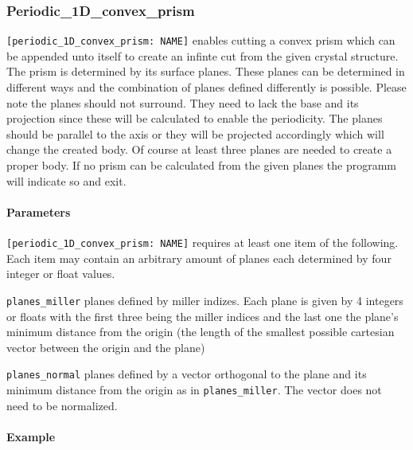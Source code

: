 \subsubsection{Periodic\_1D\_convex\_prism}
\lstinline{[periodic_1D_convex_prism: NAME]} enables cutting a convex prism which can be appended unto itself to create an infinte cut from the given crystal structure. The prism is determined by its surface planes. These planes can be determined in different ways and the combination of planes defined differently is possible. Please note the planes should not surround. They need to lack the base and its projection since these will be calculated to enable the periodicity. The planes should be parallel to the axis or they will be projected accordingly which will change the created body. Of course at least three planes are needed to create a proper body. If no prism can be calculated from the given planes the programm will indicate so and exit.

\paragraph{Parameters}
\lstinline{[periodic_1D_convex_prism: NAME]} requires at least one item of the following. Each item may contain an arbitrary amount of planes each determined by four integer or float values.

\begin{description}
 \item{\lstinline{planes_miller}} planes defined by miller indizes. Each plane is given by 4 integers or floats with the first three being the miller indices and the last one the plane's minimum distance from the origin (the length of the smallest possible cartesian vector between the origin and the plane)
 \item{\lstinline{planes_normal}} planes defined by a vector orthogonal to the plane and its minimum distance from the origin as in \lstinline{planes_miller}. The vector does not need to be normalized.
\end{description} 


\paragraph{Example}\

